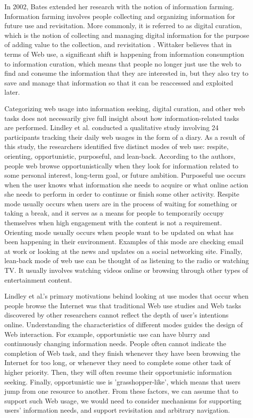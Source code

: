 \documentclass{casconpaper}
\begin{document}
{In 2002, Bates \cite{bates2002} extended her research with the notion of information farming. Information farming involves people collecting and organizing information for future use and revisitation. More commonly, it is referred to as digital curation, which is the notion of collecting and managing digital information for the purpose of adding value to the collection, and revisitation \cite{beagrie}. Wittaker \cite{wittaker} believes that in terms of Web use, a significant shift is happening from information consumption to information curation, which means that people no longer just use the web to find and consume the information that they are interested in, but they also try to save and manage that information so that  it can be reaccessed and exploited later. 

Categorizing web usage into information seeking,  digital curation, and other web tasks does not necessarily give full insight about how information-related tasks are performed. Lindley et al. \cite{lindley} conducted a qualitative study involving 24 participants tracking their daily web usages in the form of a diary. As a result of this study, the researchers identified five distinct modes of web use: respite, orienting, opportunistic, purposeful, and lean-back. According to the authors, people web browse opportunistically when they look for information related to some personal interest, long-term goal, or future ambition. Purposeful use occurs when the user knows what information she needs to acquire or what online action she needs to perform in order to continue or finish some other activity. Respite mode usually occurs when users are in the process of waiting for something or taking a break, and it serves as a means for people to temporarily occupy themselves when high engagement with the content is not a requirement. Orienting mode usually occurs when people want to be updated on what has been happening in their environment. Examples of this mode are checking email at work or looking at the news and updates on a social networking site. Finally, lean-back mode of web use can be thought of as listening to the radio or watching TV. It usually involves watching videos online or browsing through other types of entertainment content. 

Lindley et al.'s primary motivations behind looking at use modes that occur when people browse the Internet was that traditional Web use studies and Web tasks discovered by other researchers cannot reflect the depth of user's intentions online. Understanding the characteristics of different modes guides the design of Web interaction. For example, opportunistic use can have blurry and continuously changing information needs. People often cannot indicate the completion of Web task, and they finish whenever they have been browsing the Internet for too long, or whenever they need to complete some other task of higher priority. Then, they will often resume their opportunistic information seeking. Finally, opportunistic use is 'grasshopper-like', which means that users jump from one resource to another. From these factors, we can assume that to support such Web usage, we would need to consider mechanisms for supporting users' information needs, and support revisitation and arbitrary navigation.

}
\end{document}

